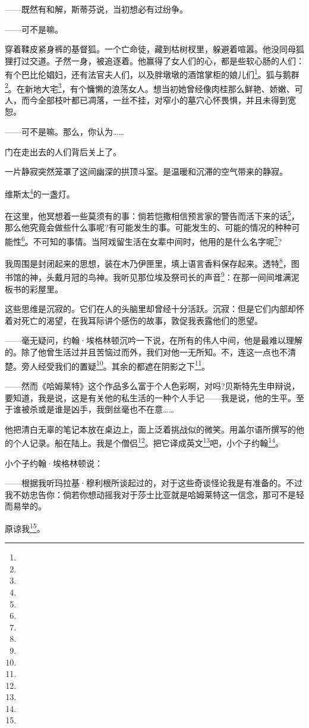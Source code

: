 \par ——既然有和解，斯蒂芬说，当初想必有过纷争。
\par ——可不是嘛。
\par 穿着鞣皮紧身裤的基督狐。一个亡命徒，藏到枯树杈里，躲避着喧嚣。他没同母狐狸打过交道。孑然一身，被追逐着。他赢得了女人们的心，都是些软心肠的人们：有个巴比伦娼妇，还有法官夫人们，以及胖墩墩的酒馆掌柜的娘儿们\footnote{}。狐与鹅群\footnote{}。在新地大宅\footnote{}，有个慵懒的浪荡女人。想当初她曾经像肉桂那么鲜艳、娇嫩、可人，而今全部枝叶都已凋落，一丝不挂，对窄小的墓穴心怀畏惧，并且未得到宽恕。
\par ——可不是嘛。那么，你认为……
\par 门在走出去的人们背后关上了。
\par 一片静寂突然笼罩了这间幽深的拱顶斗室。是温暖和沉滞的空气带来的静寂。
\par 维斯太\footnote{}的一盏灯。
\par 在这里，他冥想着一些莫须有的事：倘若恺撒相信预言家的警告而活下来的话\footnote{}，那么他究竟会做些什么事呢?有可能发生的事。可能发生的、可能的情况的种种可能性\footnote{}。不可知的事情。当阿戏留生活在女辈中间时，他用的是什么名字呢\footnote{}?
\par 我周围是封闭起来的思想，装在木乃伊匣里，填上语言香料保存起来。透特\footnote{}，图书馆的神，头戴月冠的鸟神。我听见那位埃及祭司长的声音\footnote{}：在那一间间堆满泥板书的彩屋里。
\par 这些思维是沉寂的。它们在人的头脑里却曾经十分活跃。沉寂：但是它们内部却怀着对死亡的渴望，在我耳际讲个感伤的故事，敦促我表露他们的愿望。
\par ——毫无疑问，约翰·埃格林顿沉吟一下说，在所有的伟人中间，他是最难以理解的。除了他曾生活过并且苦恼过而外，我们对他一无所知。不，连这一点也不清楚。旁人经受我们的置疑\footnote{}。其余的都遮在阴影之下\footnote{}。
\par ——然而《哈姆莱特》这个作品多么富于个人色彩啊，对吗?贝斯特先生申辩说，要知道，我是说，这是有关他的私生活的一种个人手记——我是说，他的生平。至于谁被杀或是谁是凶手，我倒丝毫也不在意……
\par 他把清白无辜的笔记本放在桌边上，面上泛着挑战似的微笑。用盖尔语所撰写的他的个人记录。船在陆上。我是个僧侣\footnote{}。把它译成英文\footnote{}吧，小个子约翰\footnote{}。
\par 小个子约翰·埃格林顿说：
\par ——根据我听玛拉基·穆利根所谈起过的，对于这些奇谈怪论我是有准备的。不过我不妨忠告你：倘若你想动摇我对于莎士比亚就是哈姆莱特这一信念，那可不是轻而易举的。
\par 原谅我\footnote{}。
